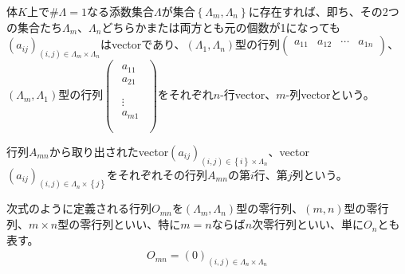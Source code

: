 \documentclass[dvipdfmx]{jsarticle}
\begin{document}
\begin{dfn}
体$K$上で${\#}\varLambda = 1$なる添数集合$\varLambda$が集合$\left\{ \varLambda_{m},\varLambda_{n} \right\}$に存在すれば、即ち、その2つの集合たち$\varLambda_{m}$、$\varLambda_{n}$どちらかまたは両方とも元の個数が1になっても$\left( a_{ij} \right)_{(i,j) \in \varLambda_{m} \times \varLambda_{n}}$はvectorであり、$\left( \varLambda_{1},\varLambda_{n} \right)$型の行列$\begin{pmatrix}
a_{11} & a_{12} & \cdots & a_{1n} \\
\end{pmatrix}$、$\left( \varLambda_{m},\varLambda_{1} \right)$型の行列$\begin{pmatrix}
\begin{matrix}
a_{11} \\
a_{21} \\
\end{matrix} \\
\begin{matrix}
 \vdots \\
a_{m1} \\
\end{matrix} \\
\end{pmatrix}$をそれぞれ$n$-行vector、$m$-列vectorという。
\end{dfn}
\begin{dfn}
行列$A_{mn}$から取り出されたvector$\left( a_{ij} \right)_{(i,j) \in \left\{ i \right\} \times \varLambda_{n}}$、vector$\left( a_{ij} \right)_{(i,j) \in \varLambda_{n} \times \left\{ j \right\}}$をそれぞれその行列$A_{mn}$の第$i$行、第$j$列という。
\end{dfn}
\begin{dfn}
次式のように定義される行列$O_{mn}$を$\left( \varLambda_{m},\varLambda_{n} \right)$型の零行列、$(m,n)$型の零行列、$m \times n$型の零行列といい、特に$m = n$ならば$n$次零行列といい、単に$O_{n}$とも表す。
\begin{align*}
O_{mn} = (0)_{(i,j) \in \varLambda_{n} \times \varLambda_{n}}
\end{align*}
\end{dfn}
\end{document}
